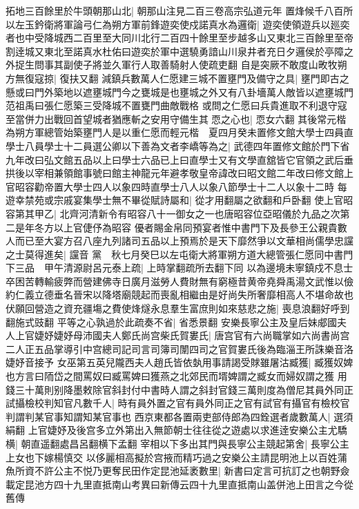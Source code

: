 拓地三百餘里於牛頭朝那山北|{
	朝那山注見二百三卷高宗弘道元年}
置烽候千八百所以左玉鈐衛將軍論弓仁為朔方軍前鋒遊奕使戍諾真水為邏衛|{
	遊奕使領遊兵以廵奕者也中受降城西二百里至大同川北行二百四十餘里至步越多山又東北三百餘里至帝割逹城又東北至諾真水杜佑曰遊奕於軍中選驍勇諳山川泉井者充日夕邏侯於亭障之外捉生問事其副使子將並久軍行人取善騎射人使疏吏翻}
自是突厥不敢度山畋牧朔方無復寇掠|{
	復扶又翻}
減鎮兵數萬人仁愿建三城不置壅門及備守之具|{
	壅門即古之懸或曰門外築地以遮壅城門今之甕城是也壅城之外又有八卦墻萬人敵皆以遮壅城門范祖禹曰張仁愿築三受降城不置甕門曲敵戰格}
或問之仁愿曰兵貴進取不利退守寇至當併力出戰回首望城者猶應斬之安用守備生其恧之心也|{
	恧女六翻}
其後常元楷為朔方軍總管始築壅門人是以重仁愿而輕元楷　夏四月癸未置修文館大學士四員直學士八員學士十二員選公卿以下善為文者李嶠等為之|{
	武德四年置修文館於門下省九年改曰弘文館五品以上曰學士六品已上曰直學士又有文學直舘皆它官領之武后垂拱後以宰相兼領館事號曰館主神龍元年避孝敬皇帝諱改曰昭文館二年改曰修文館上官昭容勸帝置大學士四人以象四時直學士八人以象八節學士十二人以象十二時}
每遊幸禁苑或宗戚宴集學士無不畢從賦詩屬和|{
	從才用翻屬之欲翻和戶卧翻}
使上官昭容第其甲乙|{
	北齊河清新令有昭容八十一御女之一也唐昭容位亞昭儀於九品之次第二是年冬方以上官倢伃為昭容}
優者賜金帛同預宴者惟中書門下及長參王公親貴數人而已至大宴方召八座九列諸司五品以上預焉於是天下靡然爭以文華相尚儒學忠讜之士莫得進矣|{
	讜音}
黨　秋七月癸巳以左屯衛大將軍朔方道大總管張仁愿同中書門下三品　甲午清源尉呂元泰上疏|{
	上時掌翻疏所去翻下同}
以為邊境未寧鎮戍不息士卒困苦轉輸疲弊而營建佛寺日廣月滋勞人費財無有窮極昔黄帝堯舜禹湯文武惟以儉約仁義立德垂名晉宋以降塔廟競起而喪亂相繼由是好尚失所奢靡相高人不堪命故也伏願回營造之資充疆塲之費使烽燧永息羣生富庶則如來慈悲之施|{
	喪息浪翻好呼到翻施式豉翻}
平等之心孰過於此疏奏不省|{
	省悉景翻}
安樂長寧公主及皇后妹郕國夫人上官婕妤婕妤母沛國夫人鄭氏尚宫柴氏賀婁氏|{
	唐宫官有六尚職掌如六尚書尚宫二人正五品掌導引中宫總司記司言司簿司闈四司之官賀婁氏後為臨淄王所誅樂音洛婕妤音接予}
女巫第五英兒隴西夫人趙氏皆依埶用事請謁受賕雖屠沽臧獲|{
	臧獲奴婢也方言曰陑岱之間罵奴曰臧罵婢曰獲燕之北郊民而壻婢謂之臧女而婦奴謂之獲}
用錢三十萬則别降墨敕除官斜封付中書時人謂之斜封官錢三萬則度為僧尼其員外同正試攝檢校判知官凡數千人|{
	時有員外置之官有員外同正之官有試官有攝官有檢校官判謂判某官事知謂知某官事也}
西京東都各置兩吏部侍郎為四銓選者歲數萬人|{
	選須絹翻}
上官婕妤及後宫多立外第出入無節朝士往往從之遊處以求進逹安樂公主尤驕横|{
	朝直遥翻處昌呂翻横下孟翻}
宰相以下多出其門與長寧公主競起第舍|{
	長寧公主上女也下嫁楊慎交}
以侈麗相高擬於宫掖而精巧過之安樂公主請昆明池上以百姓蒲魚所資不許公主不悦乃更奪民田作定昆池延袤數里|{
	新書曰定言可抗訂之也朝野僉載定昆池方四十九里直抵南山考異曰新傳云四十九里直抵南山盖併池上田言之今從舊傳}

